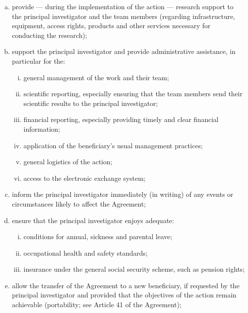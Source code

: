 \documentclass[12pt]{scrartcl}
\begin{document}
\begin{enumerate}[a), itemsep=-2pt]
    \item provide --- during the implementation of the action --- research
    support to the principal investigator and the team members (regarding
    infrastructure, equipment, access rights, products and other services
    necessary for conducting the research);

    \item support the principal investigator and provide administrative assistance,
    in particular for the:

    \begin{enumerate}[i),itemsep=-5pt,partopsep=-5pt]
        \item general management of the work and their team;
        \item scientific reporting, especially ensuring that the team members send
        their scientific results to the principal investigator;
        \item financial reporting, especially providing timely and clear financial
        information;
        \item application of the beneficiary's usual management practices;
        \item general logistics of the action;
        \item access to the electronic exchange system;
    \end{enumerate}

    \item inform the principal investigator immediately (in writing) of any
    events or circumstances likely to affect the Agreement;

    \item ensure that the principal investigator enjoys adequate:

    \begin{enumerate}[i),itemsep=-5pt,partopsep=-5pt]
        \item conditions for annual, sickness and parental leave;
        \item occupational health and safety standards;
        \item insurance under the general social security scheme, such as
        pension rights;
    \end{enumerate}

    \item allow the transfer of the Agreement to a new beneficiary, if
    requested by the principal investigator and provided that the objectives of
    the action remain achievable (portability; see Article 41 of the Agreement);


\end{enumerate}
\end{document}
